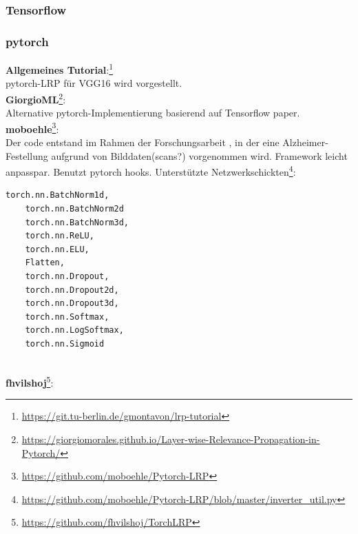\documentclass[11pt,a4paper]{article}
\numberwithin{equation}{section}
\begin{document}
	\subsubsection{Tensorflow}
	\subsubsection{pytorch}
	
	\textbf{Allgemeines Tutorial}:\footnote{\url{https://git.tu-berlin.de/gmontavon/lrp-tutorial}}\\ pytorch-LRP für VGG16 wird vorgestellt.\\
	
	
	\noindent \textbf{GiorgioML}\footnote{\url{https://giorgiomorales.github.io/Layer-wise-Relevance-Propagation-in-Pytorch/}}:\\
	Alternative pytorch-Implementierung basierend auf Tensorflow paper.\\
	
	\noindent \textbf{moboehle}\footnote{\url{https://github.com/moboehle/Pytorch-LRP}}:\\
	Der code entstand im Rahmen der Forschungsarbeit \cite{lrp_alzheimer}, in der eine Alzheimer-Festellung aufgrund von Bilddaten(scans?) vorgenommen wird. Framework leicht anpasspar. Benutzt pytorch hooks. 
	\noindent Unterstützte Netzwerkschickten\footnote{\url{https://github.com/moboehle/Pytorch-LRP/blob/master/inverter_util.py}}:\\

	\begin{lstlisting}[language=Python, caption=Verfügbare Schichten und Aktivierungsfunktionen]
	torch.nn.BatchNorm1d, 
	torch.nn.BatchNorm2d
	torch.nn.BatchNorm3d,
	torch.nn.ReLU, 
	torch.nn.ELU, 
	Flatten,
	torch.nn.Dropout,
	torch.nn.Dropout2d,
	torch.nn.Dropout3d,
	torch.nn.Softmax,
	torch.nn.LogSoftmax,
	torch.nn.Sigmoid
	
	\end{lstlisting}
	\noindent \textbf{fhvilshoj}\footnote{\url{https://github.com/fhvilshoj/TorchLRP}}:\\
	
\end{document}
